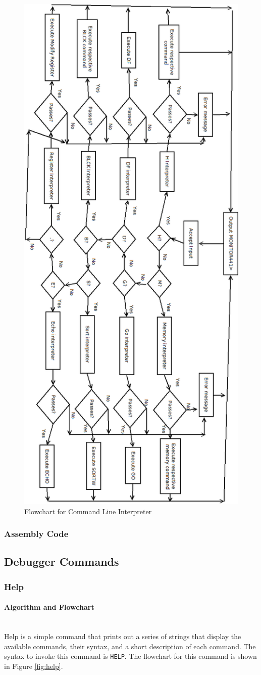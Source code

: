 \documentclass[12pt]{article}
\begin{document}
			\begin{figure}[H]
				\centering
				\includegraphics[width=.55\linewidth]{commandint}
				\caption{Flowchart for Command Line Interpreter}
				\label{fig:commandint}
			\end{figure}
			
			\subsubsection{Assembly Code}
			
			
			\subsection{Debugger Commands}
			\subsubsection{Help}
			\paragraph{Algorithm and Flowchart}~\\
			Help is a simple command that prints out a series of strings that display the available commands, their syntax, and a short description of each command. The syntax to invoke this command is \texttt{HELP}. The flowchart for this command is shown in Figure \ref{fig:help}.
			
\end{document}

